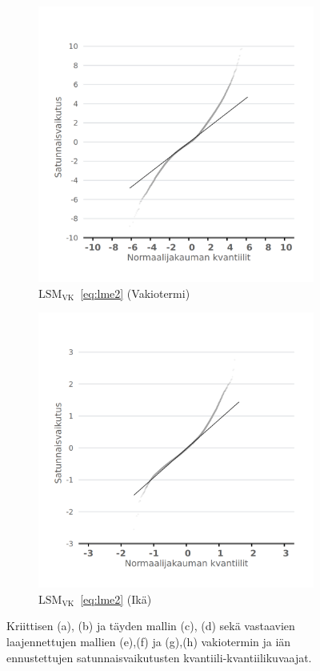 \documentclass[finnish]{docopts}
\begin{document}
\begin{figure}[H]
\begin{subfigure}[b]{0.4\textwidth}
  \label{fig:lme_vk_krit_ika_qq}
\end{subfigure}
\begin{subfigure}[b]{0.4\textwidth}
\centering
  \includegraphics[width=.8\linewidth]{kuvaajat/lme3_full_vc_qq_ranef_int.png}
  \caption{$\text{LSM}_{\text{VK}}$~\ref{eq:lme2} (Vakiotermi)}
  \label{fig:lme_vk_taysi_int_qq}
\end{subfigure}%
\begin{subfigure}[b]{0.4\textwidth}
\centering
  \includegraphics[width=.8\linewidth]{kuvaajat/lme3_full_vc_qq_ranef_ika.png}
  \caption{$\text{LSM}_{\text{VK}}$~\ref{eq:lme2} (Ikä)}
  \label{fig:lme_vk_taysi_ika_qq}
\end{subfigure}
 \caption{Kriittisen (a), (b) ja täyden mallin (c), (d) sekä vastaavien laajennettujen mallien (e),(f) ja (g),(h) vakiotermin ja iän ennustettujen satunnaisvaikutusten kvantiili-kvantiilikuvaajat.}
   \label{fig:lme_ranef_qq}
\end{figure}
\end{document}
